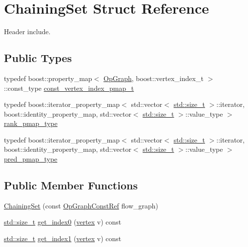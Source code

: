\hypertarget{structChainingSet}{}\section{Chaining\+Set Struct Reference}
\label{structChainingSet}


Header include.  


\subsection*{Public Types}
\begin{DoxyCompactItemize}
\item 
typedef boost\+::property\+\_\+map$<$ \hyperlink{structOpGraph}{Op\+Graph}, boost\+::vertex\+\_\+index\+\_\+t $>$\+::const\+\_\+type \hyperlink{structChainingSet_a770d83c8828c7b38df1925810bf31e31}{const\+\_\+vertex\+\_\+index\+\_\+pmap\+\_\+t}
\item 
typedef boost\+::iterator\+\_\+property\+\_\+map$<$ std\+::vector$<$ \hyperlink{tutorial__pact__2019_2Introduction_2sixth_2test_8c_a7c94ea6f8948649f8d181ae55911eeaf}{std\+::size\+\_\+t} $>$\+::iterator, boost\+::identity\+\_\+property\+\_\+map, std\+::vector$<$ \hyperlink{tutorial__pact__2019_2Introduction_2sixth_2test_8c_a7c94ea6f8948649f8d181ae55911eeaf}{std\+::size\+\_\+t} $>$\+::value\+\_\+type $>$ \hyperlink{structChainingSet_aebbcd031d5f20a8ff678fff4688c9d77}{rank\+\_\+pmap\+\_\+type}
\item 
typedef boost\+::iterator\+\_\+property\+\_\+map$<$ std\+::vector$<$ \hyperlink{tutorial__pact__2019_2Introduction_2sixth_2test_8c_a7c94ea6f8948649f8d181ae55911eeaf}{std\+::size\+\_\+t} $>$\+::iterator, boost\+::identity\+\_\+property\+\_\+map, std\+::vector$<$ \hyperlink{tutorial__pact__2019_2Introduction_2sixth_2test_8c_a7c94ea6f8948649f8d181ae55911eeaf}{std\+::size\+\_\+t} $>$\+::value\+\_\+type $>$ \hyperlink{structChainingSet_a0c0db2b75967dbe93b78cd1f4751c780}{pred\+\_\+pmap\+\_\+type}
\end{DoxyCompactItemize}
\subsection*{Public Member Functions}
\begin{DoxyCompactItemize}
\item 
\hyperlink{structChainingSet_a3793419c343c24a615ab1f6c008ce7e6}{Chaining\+Set} (const \hyperlink{op__graph_8hpp_a9a0b240622c47584bee6951a6f5de746}{Op\+Graph\+Const\+Ref} flow\+\_\+graph)
\item 
\hyperlink{tutorial__pact__2019_2Introduction_2sixth_2test_8c_a7c94ea6f8948649f8d181ae55911eeaf}{std\+::size\+\_\+t} \hyperlink{structChainingSet_a21c7efb9e25a51d54b023719b7e86ec4}{get\+\_\+index0} (\hyperlink{graph_8hpp_abefdcf0544e601805af44eca032cca14}{vertex} v) const
\item 
\hyperlink{tutorial__pact__2019_2Introduction_2sixth_2test_8c_a7c94ea6f8948649f8d181ae55911eeaf}{std\+::size\+\_\+t} \hyperlink{structChainingSet_a92c3ae0bdea1642627a55b71f23be012}{get\+\_\+index1} (\hyperlink{graph_8hpp_abefdcf0544e601805af44eca032cca14}{vertex} v) const
\end{DoxyCompactItemize}
